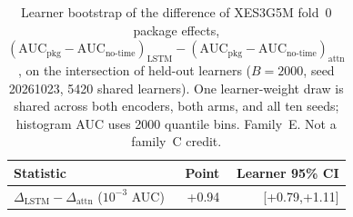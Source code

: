 \begin{table}[tbp]
\caption{Learner bootstrap of the difference of XES3G5M fold~0 package
effects, $(\mathrm{AUC}_{\mathrm{pkg}}-\mathrm{AUC}_{\mathrm{no\text{-}time}})_{\mathrm{LSTM}}
-(\mathrm{AUC}_{\mathrm{pkg}}-\mathrm{AUC}_{\mathrm{no\text{-}time}})_{\mathrm{attn}}$,
on the intersection of held-out learners ($B{=}2000$, seed 20261023,
5420 shared learners). One learner-weight draw is shared across both encoders, both arms,
and all ten seeds; histogram AUC uses 2000 quantile bins. Family~E. Not a family~C credit.}
\label{tab:lstm-attn-delta}
\centering
\footnotesize
\begin{tabular}{@{}lrr@{}}
\toprule
Statistic & Point & Learner 95\% CI \\
\midrule
$\Delta_{\mathrm{LSTM}}-\Delta_{\mathrm{attn}}$ ($10^{-3}$ AUC) & +0.94 & [+0.79,+1.11] \\
\bottomrule
\end{tabular}
\end{table}
